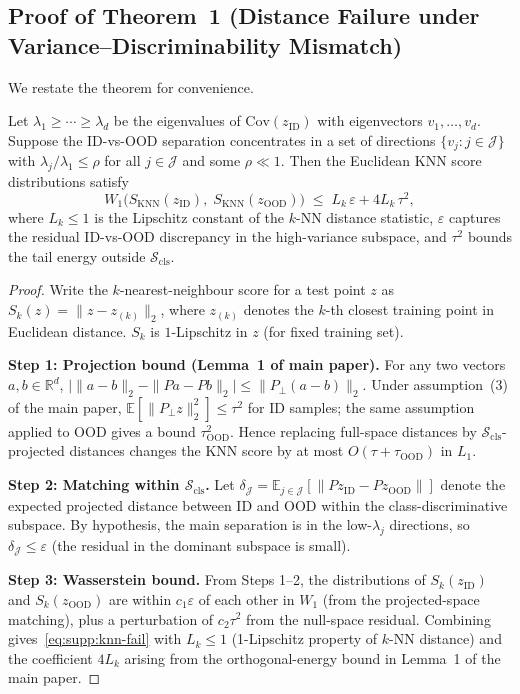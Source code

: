 \documentclass[runningheads]{llncs}
\begin{document}
\subsection{Proof of Theorem~1 (Distance Failure under Variance--Discriminability Mismatch)}
\label{sec:supp:proof-thm1}

We restate the theorem for convenience.

\begin{theorem}\label{thm:supp:dist-fail}
Let $\lambda_1 \ge \cdots \ge \lambda_d$ be the eigenvalues of $\mathrm{Cov}(z_{\mathrm{ID}})$
with eigenvectors $v_1,\ldots,v_d$.
Suppose the ID-vs-OOD separation concentrates in a set of directions
$\{v_j : j \in \mathcal{J}\}$ with $\lambda_j / \lambda_1 \le \rho$ for all $j \in \mathcal{J}$ and some $\rho \ll 1$.
Then the Euclidean KNN score distributions satisfy
\begin{equation}
  W_1\!\bigl(S_{\mathrm{KNN}}(z_{\mathrm{ID}}),\; S_{\mathrm{KNN}}(z_{\mathrm{OOD}})\bigr)
  \;\le\; L_k\,\varepsilon + 4L_k\,\tau^2,
  \label{eq:supp:knn-fail}
\end{equation}
where $L_k \le 1$ is the Lipschitz constant of the $k$-NN distance statistic, $\varepsilon$ captures the residual ID-vs-OOD discrepancy in the high-variance
subspace, and $\tau^2$ bounds the tail energy outside $\mathcal{S}_{\mathrm{cls}}$.
\end{theorem}

\begin{proof}
Write the $k$-nearest-neighbour score for a test point $z$ as
$S_k(z) = \|z - z_{(k)}\|_2$,
where $z_{(k)}$ denotes the $k$-th closest training point in Euclidean distance.
$S_k$ is $1$-Lipschitz in $z$ (for fixed training set).

\textbf{Step 1: Projection bound (Lemma~1 of main paper).}
For any two vectors $a, b \in \mathbb{R}^d$,
$\bigl|\|a-b\|_2 - \|Pa - Pb\|_2\bigr| \le \|P_\perp(a-b)\|_2$.
Under assumption~(3) of the main paper, $\mathbb{E}[\|P_\perp z\|_2^2] \le \tau^2$ for
ID samples; the same assumption applied to OOD gives a bound $\tau^2_{\mathrm{OOD}}$.
Hence replacing full-space distances by $\mathcal{S}_{\mathrm{cls}}$-projected distances
changes the KNN score by at most $O(\tau + \tau_{\mathrm{OOD}})$ in $L_1$.

\textbf{Step 2: Matching within $\mathcal{S}_{\mathrm{cls}}$.}
Let $\delta_{\mathcal{J}} = \mathbb{E}_{j \in \mathcal{J}}[\|Pz_{\mathrm{ID}} - Pz_{\mathrm{OOD}}\|]$
denote the expected projected distance between ID and OOD within the class-discriminative
subspace.
By hypothesis, the main separation is in the low-$\lambda_j$ directions, so
$\delta_{\mathcal{J}} \le \varepsilon$ (the residual in the dominant subspace is small).

\textbf{Step 3: Wasserstein bound.}
From Steps 1--2, the distributions of $S_k(z_{\mathrm{ID}})$ and $S_k(z_{\mathrm{OOD}})$
are within $c_1\varepsilon$ of each other in $W_1$ (from the projected-space matching),
plus a perturbation of $c_2\tau^2$ from the null-space residual.
Combining gives~\eqref{eq:supp:knn-fail} with $L_k \le 1$ (1-Lipschitz property of $k$-NN distance)
and the coefficient $4L_k$ arising from the orthogonal-energy bound in Lemma~1 of the main paper.
\end{proof}
\end{document}
